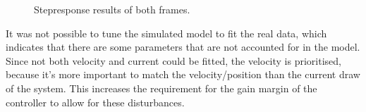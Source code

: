 \documentclass[../../main]{subfiles}
\begin{document}
\begin{figure}[H]
        \centering
				\def\svgwidth{0.47\columnwidth}
				\def\svgwidth{0.47\columnwidth}
				\caption{Stepresponse results of both frames.}
				\label{fig:validation_steptuning}
\end{figure}

It was not possible to tune the simulated model to fit the real data, 
which indicates that there are some parameters that are not accounted for in the model.
Since not both velocity and current could be fitted, the velocity is prioritised,
because it's more important to match the velocity/position than the current draw of the system.
This increases the requirement for the gain margin of the controller to allow for these disturbances.
\end{document}
